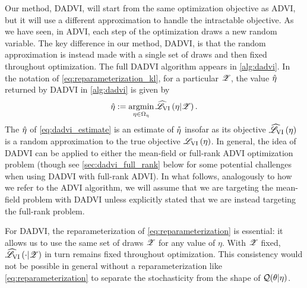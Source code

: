 Our method, DADVI, will start from the same optimization objective as ADVI, but
it will use a different approximation to handle the intractable objective. As we
have seen, in ADVI, each step of the optimization draws a new random variable.
The key difference in our method, DADVI, is that the random approximation is
instead made with a single set of draws and then fixed throughout optimization.
The full DADVI algorithm appears in \cref{alg:dadvi}. In the notation of
\cref{eq:reparameterization_kl}, for a particular $\mathscr{Z}$, 
the value $\hat{\eta}$ returned by DADVI in \cref{alg:dadvi} is given by
%
\begin{align}\label{eq:dadvi_estimate}
    \hat{\eta} := \operatorname*{\mathrm{argmin}}_{\eta \in \Omega_{\eta}} \widehat{\mathscr{L}}_{\mathrm{VI}}\left(\eta | \mathscr{Z}\right).
\end{align}
%
The $\hat{\eta}$ of \cref{eq:dadvi_estimate} is an estimate of $\accentset{*}{\eta}$ insofar
as its objective $\widehat{\mathscr{L}}_{\mathrm{VI}}\left(\eta\right)$ is a random approximation to the true objective
$\mathscr{L}_{\mathrm{VI}}\left(\eta\right)$. In general, the idea of DADVI can be applied to either the
mean-field or full-rank ADVI optimization problem (though see
\cref{sec:dadvi_full_rank} below for some potential challenges when using DADVI
with full-rank ADVI).  In what follows, analogously to how we refer to the ADVI
algorithm, we will assume that we are targeting the mean-field problem with
DADVI unless explicitly stated that we are instead targeting the full-rank
problem.


For DADVI, the reparameterization of \cref{eq:reparameterization} is essential:
it allows us to use the same set of draws $\mathscr{Z}$ for any value of $\eta$. With
$\mathscr{Z}$ fixed, $\widehat{\mathscr{L}}_{\mathrm{VI}}\left(\cdot | \mathscr{Z}\right)$ in turn remains fixed throughout optimization.
This consistency would not be possible in general without a reparameterization
like \cref{eq:reparameterization} to separate the stochasticity from the shape
of $\mathcal{Q}(\theta \vert \eta)$.  %

